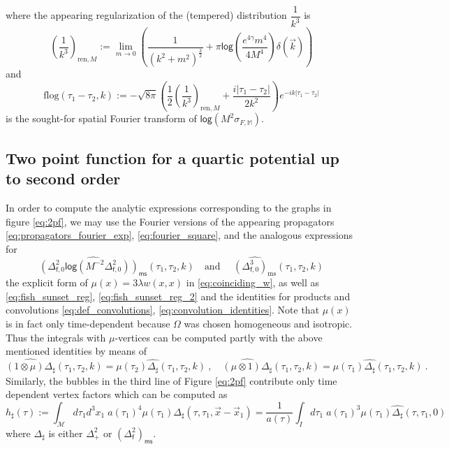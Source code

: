 \documentclass[11pt]{book}
\newcommand{\ms}{\mathsf{ms}}
\renewcommand{\log}{\mathsf{log}}
\newcommand{\Mcal}{\mathcal{M}}
\newcommand{\Mbb}{\mathbb{M}}
\newcommand{\fsf}{\mathsf{f}}
\theoremstyle{break}
\begin{document}
%
where the appearing regularization of the (tempered) distribution $\dfrac{1}{k^3}$ is 
%
\begin{equation}
\left(\frac{1}{k^3}\right)_{\text{ren},M}:=\lim_{m\to 0}\left(\frac{1}{(k^2+m^2)^{\frac32}}+\pi\log\left(\frac{e^{4\gamma}m^4}{4 M^4}\right)\delta(\vec{k})\right)
\label{eq:regk3}
\end{equation}
and
\begin{equation}
\text{flog}(\tau_1-\tau_2,k):=-\sqrt{8\pi}\left(\frac{1}{2}\left(\frac{1}{k^3}\right)_{\text{ren},M}+\frac{i|\tau_1-\tau_2|}{2k^2}\right)e^{-ik|\tau_1-\tau_2|}
\label{eq:flog}
\end{equation}
%
is the sought-for spatial Fourier transform of $\log \left(M^2 \sigma_{F,\Mbb}\right)$. 

\subsection{Two point function for a quartic potential up to second order}


In order to compute the analytic expressions corresponding to the graphs in figure \eqref{eq:2pf}, we may use the Fourier versions of the appearing propagators \eqref{eq:propagators_fourier_exp}, \eqref{eq:fourier_square}, and the analogous expressions for 
%
\begin{equation*}
\widehat{\left(\Delta^2_{\fsf,0}\log\left(M^{-2}\Delta^2_{\fsf,0}\right) \right)_\ms}(\tau_1,\tau_2,k) \quad \mbox{and } \quad \widehat{\left(\Delta^3_{\fsf,0}\right)_\text{ms}}(\tau_1,\tau_2,k)
\end{equation*}
%
the explicit form of $\mu(x)=3\lambda w(x,x)$ in \eqref{eq:coinciding_w}, as well as \eqref{eq:fish_sunset_reg}, \eqref{eq:fish_sunset_reg_2} and the identities for products and convolutions \eqref{eq:def_convolutions}, \eqref{eq:convolution_identities}. Note that $\mu(x)$ is in fact only time-dependent because $\Omega$ was chosen homogeneous and isotropic. Thus the integrals with $\mu$-vertices can be computed partly with the above mentioned identities by means of 
%
\begin{equation*}
\widehat{(1\otimes \mu) \Delta_{\sharp}}(\tau_1,\tau_2,k)=\mu(\tau_2)\widehat{\Delta_{\sharp}}(\tau_1,\tau_2,k) \ , \quad\widehat{(\mu\otimes 1) \Delta_{\sharp}}(\tau_1,\tau_2,k)=\mu(\tau_1)\widehat{\Delta_{\sharp}}(\tau_1,\tau_2,k) \ . 
\end{equation*}
%
Similarly, the bubbles in the third line of Figure \eqref{eq:2pf} contribute only time dependent vertex factors which can be computed as 
%
\begin{equation*}
h_\sharp(\tau):=\int_\Mcal d\tau_1 d^3x_1\; a(\tau_1)^4\mu(\tau_1)\Delta_\sharp(\tau,\tau_1,\vec{x}-\vec{x}_1)=\frac{1}{a(\tau)}\int_I d\tau_1\;a(\tau_1)^3 \mu(\tau_1)\widehat{\Delta_\sharp}(\tau,\tau_1,0) 
\end{equation*}
%
where $\Delta_\sharp$ is either $\Delta^2_+$ or $\left(\Delta^2_\fsf\right)_\ms$.
\end{document}
